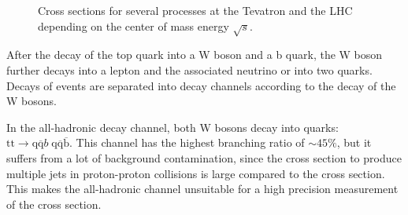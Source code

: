 \begin{figure}[htbp!]
  \begin{center}
\caption{Cross sections for several processes at the Tevatron and the LHC depending on the center of mass energy $\sqrt{s}$\cite{Olive:2016xmw}.
  \label{fig:theo_xsecs}}
  \end{center}
\end{figure}


After the decay of the top quark into a W boson and a b quark, the W boson further decays into a lepton and the associated neutrino or into two quarks.
Decays of \ttbar events are separated into decay channels according to the decay of the W bosons.

In the all-hadronic decay channel, both W bosons decay into quarks: $\mathrm{tt} \rightarrow \mathrm{q}\overline{\mathrm{q}}b \; \mathrm{q}\overline{\mathrm{q}}\overline{\mathrm{b}}$. This channel has the highest branching ratio of $\sim 45\%$, but it suffers from a lot of background contamination,
since the cross section to produce multiple jets in proton-proton collisions is large compared to the \ttbar cross section. This makes the all-hadronic channel unsuitable for a high precision measurement of the \ttbar cross section.

